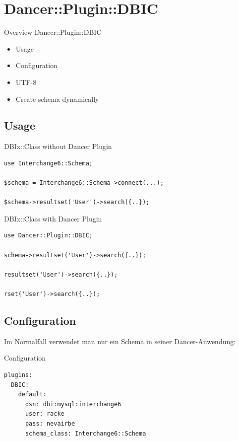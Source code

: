 \section{Dancer::Plugin::DBIC}

\begin{frame}{Overview Dancer::Plugin::DBIC}
\begin{itemize}
\item Usage
\item Configuration
\item UTF-8
\item Create schema dynamically
\end{itemize}
\end{frame}

\subsection{Usage}
\begin{frame}[fragile]{DBIx::Class without Dancer Plugin}
\begin{lstlisting}
use Interchange6::Schema;

$schema = Interchange6::Schema->connect(...);

$schema->resultset('User')->search({..});
\end{lstlisting}
\end{frame}

\begin{frame}[fragile]{DBIx::Class with Dancer Plugin}
\begin{lstlisting}
use Dancer::Plugin::DBIC;

schema->resultset('User')->search({..});

resultset('User')->search({..});

rset('User')->search({..});
\end{lstlisting}
\end{frame}

\subsection{Configuration}

Im Normalfall verwendet man nur ein Schema in seiner
Dancer-Anwendung:

\begin{frame}[fragile]{Configuration}
\begin{lstlisting}
plugins:
  DBIC:
    default:
      dsn: dbi:mysql:interchange6
      user: racke
      pass: nevairbe
      schema_class: Interchange6::Schema
\end{lstlisting}
\end{frame}

